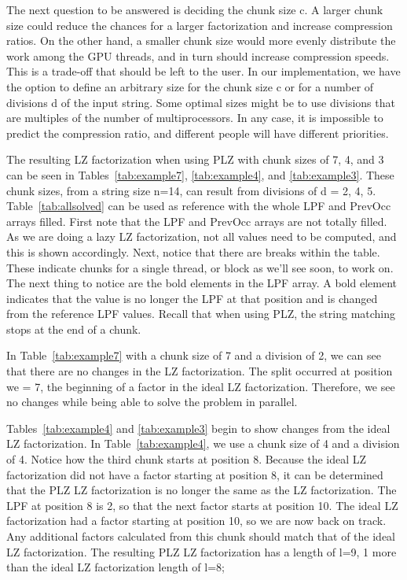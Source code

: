 The next question to be answered is deciding the chunk size c. 
A larger chunk size could reduce the chances for a larger factorization and increase compression ratios.
On the other hand, a smaller chunk size would more evenly distribute the work among the GPU threads, and in turn should increase compression speeds.
This is a trade-off that should be left to the user.
In our implementation, we have the option to define an arbitrary size for the chunk size c or for a number of divisions d of the input string.
Some optimal sizes might be to use divisions that are multiples of the number of multiprocessors.
In any case, it is impossible to predict the compression ratio, and different people will have different priorities.

The resulting LZ factorization when using PLZ with chunk sizes of 7, 4, and 3 can be seen in Tables~\ref{tab:example7}, \ref{tab:example4}, and \ref{tab:example3}. 
These chunk sizes, from a string size n=14, can result from divisions of d = 2, 4, 5.
Table~\ref{tab:allsolved} can be used as reference with the whole LPF and PrevOcc arrays filled.
First note that the LPF and PrevOcc arrays are not totally filled.
As we are doing a lazy LZ factorization, not all values need to be computed, and this is shown accordingly.
Next, notice that there are breaks within the table.
These indicate chunks for a single thread, or block as we'll see soon, to work on.
The next thing to notice are the bold elements in the LPF array.
A bold element indicates that the value is no longer the LPF at that position and is changed from the reference LPF values.
Recall that when using PLZ, the string matching stops at the end of a chunk.

In Table~\ref{tab:example7} with a chunk size of 7 and a division of 2, we can see that there are no changes in the LZ factorization.
The split occurred at position we = 7, the beginning of a factor in the ideal LZ factorization.
Therefore, we see no changes while being able to solve the problem in parallel.

Tables~\ref{tab:example4} and \ref{tab:example3} begin to show changes from the ideal LZ factorization.
In Table~\ref{tab:example4}, we use a chunk size of 4 and a division of 4.
Notice how the third chunk starts at position 8.
Because the ideal LZ factorization did not have a factor starting at position 8, it can be determined that the PLZ LZ factorization is no longer the same as the LZ factorization.
The LPF at position 8 is 2, so that the next factor starts at position 10.
The ideal LZ factorization had a factor starting at position 10, so we are now back on track.
Any additional factors calculated from this chunk should match that of the ideal LZ factorization.
The resulting PLZ LZ factorization has a length of l=9, 1 more than the ideal LZ factorization length of l=8;

